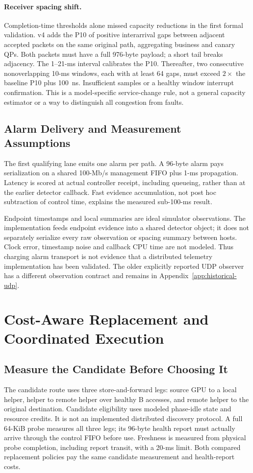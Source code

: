 \documentclass[sigconf]{acmart}
\begin{document}
\paragraph{Receiver spacing shift.}
Completion-time thresholds alone missed capacity reductions in the first
formal validation. v4 adds the P10 of positive interarrival gaps between
adjacent accepted packets on the same original path, aggregating business
and canary QPs. Both packets must have a full 976-byte payload; a short tail
breaks adjacency. The 1--21-ms interval calibrates the P10. Thereafter,
two consecutive nonoverlapping 10-ms windows, each with at least 64 gaps,
must exceed $2\times$ the baseline P10 plus 100~ns. Insufficient samples
or a healthy window interrupt confirmation. This is a model-specific
service-change rule, not a general capacity estimator or a way to distinguish
all congestion from faults.

\subsection{Alarm Delivery and Measurement Assumptions}
The first qualifying lane emits one alarm per path. A 96-byte alarm pays
serialization on a shared 100-Mb/s management FIFO plus 1-ms propagation.
Latency is scored at actual controller receipt, including queueing, rather
than at the earlier detector callback. Fast evidence accumulation, not
post hoc subtraction of control time, explains the measured sub-100-ms result.

Endpoint timestamps and local summaries are ideal simulator observations.
The implementation feeds endpoint evidence into a shared detector object;
it does not separately serialize every raw observation or spacing summary
between hosts. Clock error, timestamp noise and callback CPU time are not
modeled. Thus charging alarm transport is not evidence that a distributed
telemetry implementation has been validated. The older explicitly reported
UDP observer has a different observation contract and remains in
Appendix~\ref{app:historical-udp}.

\section{Cost-Aware Replacement and Coordinated Execution}
\label{sec:recovery-design}
\subsection{Measure the Candidate Before Choosing It}
The candidate route uses three store-and-forward legs: source GPU to a local
helper, helper to remote helper over healthy B accesses, and remote helper
to the original destination. Candidate eligibility uses modeled phase-idle
state and resource credits. It is not an implemented distributed discovery
protocol. A full 64-KiB probe measures all three legs; its 96-byte health
report must actually arrive through the control FIFO before use. Freshness
is measured from physical probe completion, including report transit, with
a 20-ms limit. Both compared replacement policies pay the same candidate
measurement and health-report costs.
\end{document}
